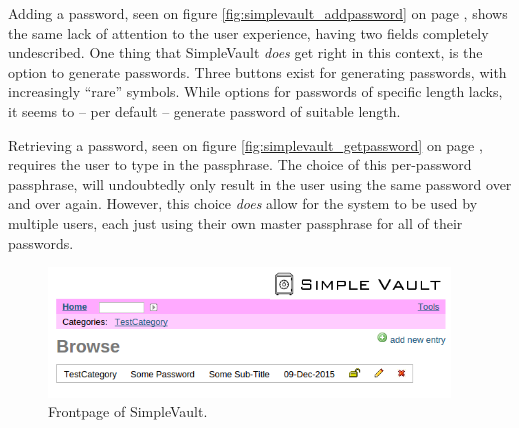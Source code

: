 			Adding a password, seen on figure \ref{fig:simplevault_addpassword} on page \pageref{fig:simplevault_addpassword}, shows the same lack of attention to the user experience, having two fields completely undescribed. One thing that SimpleVault \emph{does} get right in this context, is the option to generate passwords. Three buttons exist for generating passwords, with increasingly ``rare'' symbols. While options for passwords of specific length lacks, it seems to -- per default -- generate password of suitable length. 

			Retrieving a password, seen on figure \ref{fig:simplevault_getpassword} on page \pageref{fig:simplevault_getpassword}, requires the user to type in the passphrase. The choice of this per-password passphrase, will undoubtedly only result in the user using the same password over and over again. However, this choice \emph{does} allow for the system to be used by multiple users, each just using their own master passphrase for all of their passwords.

			\begin{figure}[htbp]
				\centering
				\includegraphics[width=0.95\textwidth]{figures/analysis/simplevault_main.png}
				\caption{Frontpage of SimpleVault.}
				\label{fig:simplevault_main}
			\end{figure}

